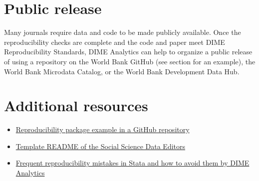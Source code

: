 \begin{fullwidth}
	\bigskip

	\section*{Public release}

	Many journals require data and code to be made publicly available. Once the reproducibility checks are complete and the code and paper meet DIME Reproducibility Standards, DIME Analytics can help to organize a public release of using a repository on the World Bank GitHub (see section  for an example), the World Bank Microdata Catalog, or the World Bank Development Data Hub.

	\section{Additional resources}
	\label{additional-resources}

	\begin{itemize}
		\item \href{https://github.com/worldbank/rio-safe-space}{Reproducibility package example in a GitHub repository}
		\item \href{https://social-science-data-editors.github.io/template_README/template-README.html}{Template README of the Social Science Data Editors}
		\item \href{https://osf.io/agkmc}{Frequent reproducibility mistakes in Stata and how to avoid them by DIME Analytics}
	\end{itemize}

	\end{fullwidth}

